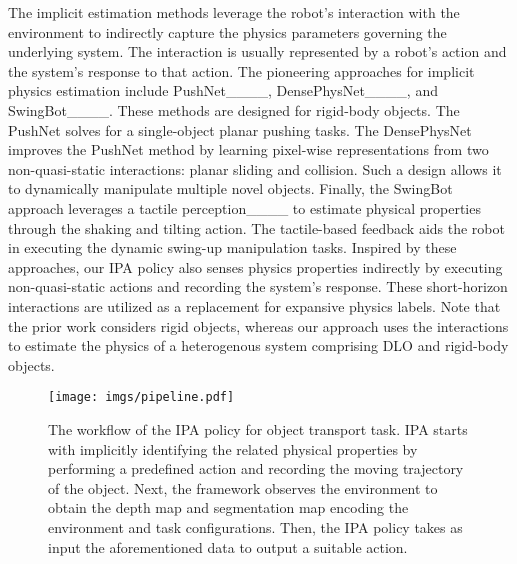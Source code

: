 The implicit estimation methods leverage the robot's interaction with the environment to indirectly capture the physics parameters governing the underlying system. The interaction is usually represented by a robot's action and the system's response to that action. The pioneering approaches for implicit physics estimation include PushNet____, DensePhysNet____, and SwingBot____. These methods are designed for rigid-body objects. The PushNet solves for a single-object planar pushing tasks. The DensePhysNet improves the PushNet method by learning pixel-wise representations from two non-quasi-static interactions: planar sliding and collision. Such a design allows it to dynamically manipulate multiple novel objects. Finally, the SwingBot approach leverages a tactile perception____ to estimate physical properties through the shaking and tilting action. The tactile-based feedback aids the robot in executing the dynamic swing-up manipulation tasks. Inspired by these approaches, our IPA policy also senses physics properties indirectly by executing non-quasi-static actions and recording the system's response. These short-horizon interactions are utilized as a replacement for expansive physics labels. Note that the prior work considers rigid objects, whereas our approach uses the interactions to estimate the physics of a heterogenous system comprising DLO and rigid-body objects.


\begin{figure*}[t]
\vspace{2.5mm}
    \texttt{[image: imgs/pipeline.pdf]}
    \caption{The workflow of the IPA policy for object transport task. IPA starts with implicitly identifying the related physical properties by performing a predefined action and recording the moving trajectory of the object. Next, the framework observes the environment to obtain the depth map and segmentation map encoding the environment and task configurations. Then, the IPA policy takes as input the aforementioned data to output a suitable action.}
    \label{fig:pipeline}
\vspace{-4.5mm}
\end{figure*}